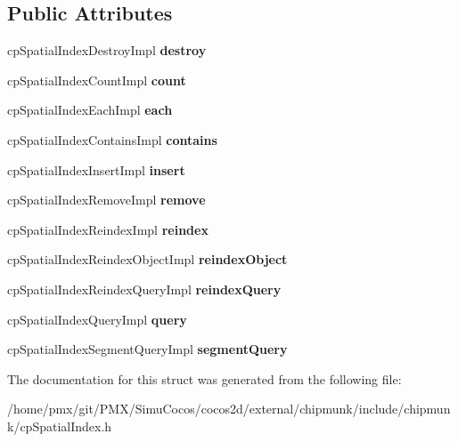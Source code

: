 \subsection*{Public Attributes}
\begin{DoxyCompactItemize}
\item 
\mbox{\label{structcpSpatialIndexClass_aa81432518e81917cf388f020aa0fe766}} 
cp\+Spatial\+Index\+Destroy\+Impl {\bfseries destroy}
\item 
\mbox{\label{structcpSpatialIndexClass_a611148802f63840b1c4f8a06feacd2eb}} 
cp\+Spatial\+Index\+Count\+Impl {\bfseries count}
\item 
\mbox{\label{structcpSpatialIndexClass_a642ebf6c60ed3edc7da5ac477c496b61}} 
cp\+Spatial\+Index\+Each\+Impl {\bfseries each}
\item 
\mbox{\label{structcpSpatialIndexClass_a08dc3736b831e921426fbb28297494e1}} 
cp\+Spatial\+Index\+Contains\+Impl {\bfseries contains}
\item 
\mbox{\label{structcpSpatialIndexClass_a5d8a8d121853ae7bcbf934e4483daa26}} 
cp\+Spatial\+Index\+Insert\+Impl {\bfseries insert}
\item 
\mbox{\label{structcpSpatialIndexClass_a420112b7d2c3d6faf07f88db697aa369}} 
cp\+Spatial\+Index\+Remove\+Impl {\bfseries remove}
\item 
\mbox{\label{structcpSpatialIndexClass_acd833dc0dd2f73e703a5c4263bbf4655}} 
cp\+Spatial\+Index\+Reindex\+Impl {\bfseries reindex}
\item 
\mbox{\label{structcpSpatialIndexClass_ae727936ae5fdcb723c9aea0577083bf6}} 
cp\+Spatial\+Index\+Reindex\+Object\+Impl {\bfseries reindex\+Object}
\item 
\mbox{\label{structcpSpatialIndexClass_a60088d6e38cafcba2fde0c41086be83a}} 
cp\+Spatial\+Index\+Reindex\+Query\+Impl {\bfseries reindex\+Query}
\item 
\mbox{\label{structcpSpatialIndexClass_a92ef2e203e2f5162ce7d673a6d538377}} 
cp\+Spatial\+Index\+Query\+Impl {\bfseries query}
\item 
\mbox{\label{structcpSpatialIndexClass_a02bf5963d4fdba46b3ecaa689b24d5cd}} 
cp\+Spatial\+Index\+Segment\+Query\+Impl {\bfseries segment\+Query}
\end{DoxyCompactItemize}


The documentation for this struct was generated from the following file\+:\begin{DoxyCompactItemize}
\item 
/home/pmx/git/\+P\+M\+X/\+Simu\+Cocos/cocos2d/external/chipmunk/include/chipmunk/cp\+Spatial\+Index.\+h\end{DoxyCompactItemize}
